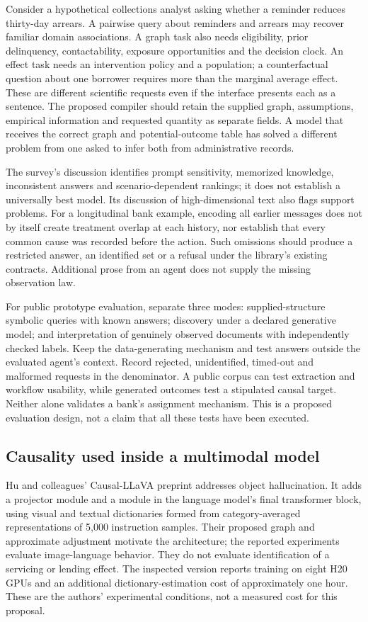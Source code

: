 Consider a hypothetical collections analyst asking whether a reminder reduces thirty-day arrears. A pairwise query about
reminders and arrears may recover familiar domain associations. A graph task also needs eligibility, prior delinquency,
contactability, exposure opportunities and the decision clock. An effect task needs an intervention policy and a population;
a counterfactual question about one borrower requires more than the marginal average effect. These are different scientific
requests even if the interface presents each as a sentence. The proposed compiler should retain the supplied graph,
assumptions, empirical information and requested quantity as separate fields. A model that receives the correct graph and
potential-outcome table has solved a different problem from one asked to infer both from administrative records.

The survey's discussion identifies prompt sensitivity, memorized knowledge, inconsistent answers and scenario-dependent
rankings; it does not establish a universally best model. Its discussion of high-dimensional text also flags support problems.
For a longitudinal bank example, encoding all earlier messages does not by itself create treatment overlap at each history,
nor establish that every common cause was recorded before the action. Such omissions should produce a restricted answer,
an identified set or a refusal under the library's existing contracts. Additional prose from an agent does not supply the
missing observation law.~\citep{exec28_fr_ma}

For public prototype evaluation, separate three modes: supplied-structure symbolic queries with known answers;
discovery under a declared generative model; and interpretation of genuinely observed documents with independently checked
labels. Keep the data-generating mechanism and test answers outside the evaluated agent's context. Record rejected,
unidentified, timed-out and malformed requests in the denominator. A public corpus can test extraction and workflow usability,
while generated outcomes test a stipulated causal target. Neither alone validates a bank's assignment mechanism.
This is a proposed evaluation design, not a claim that all these tests have been executed.

\subsection{Causality used inside a multimodal model}
Hu and colleagues' Causal-LLaVA preprint addresses object hallucination. It adds a projector module and a module in the
language model's final transformer block, using visual and textual dictionaries formed from category-averaged representations
of 5,000 instruction samples. Their proposed graph and approximate adjustment motivate the architecture; the reported
experiments evaluate image-language behavior. They do not evaluate identification of a servicing or lending effect.
The inspected version reports training on eight H20 GPUs and an additional dictionary-estimation cost of approximately
one hour. These are the authors' experimental conditions, not a measured cost for this proposal.~\citep{exec28_fr_hu}

